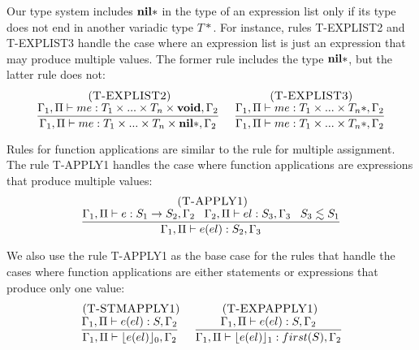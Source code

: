 Our type system includes $\mathbf{nil}{*}$ in the type of an expression list only
if its type does not end in another variadic type $T{*}$.
For instance, rules \textsc{T-EXPLIST2} and \textsc{T-EXPLIST3} handle
the case where an expression list is just an expression that may produce
multiple values.
The former rule includes the type $\mathbf{nil}{*}$, but the latter rule does not:
\[
\begin{array}{c}
\begin{array}{c}
\; (\textsc{T-EXPLIST2})\\
\dfrac{\Gamma_{1}, \Pi \vdash me:T_{1} \times ... \times T_{n} \times \mathbf{void}, \Gamma_{2}}
      {\Gamma_{1}, \Pi \vdash me:T_{1} \times ... \times T_{n} \times \mathbf{nil}{*}, \Gamma_{2}}
\end{array}
\;
\begin{array}{c}
\; (\textsc{T-EXPLIST3})\\
\dfrac{\Gamma_{1}, \Pi \vdash me:T_{1} \times ... \times T_{n}{*}, \Gamma_{2}}
      {\Gamma_{1}, \Pi \vdash me:T_{1} \times ... \times T_{n}{*}, \Gamma_{2}}
\end{array}
\end{array}
\]

Rules for function applications are similar to the rule for multiple assignment.
The rule \textsc{T-APPLY1} handles the case where function applications
are expressions that produce multiple values:
\[
\begin{array}{c}
\; (\textsc{T-APPLY1})\\
\dfrac{\Gamma_{1}, \Pi \vdash e:S_{1} \rightarrow S_{2}, \Gamma_{2} \;\;\;
       \Gamma_{2}, \Pi \vdash el:S_{3}, \Gamma_{3} \;\;\;
       S_{3} \lesssim S_{1}}
      {\Gamma_{1}, \Pi \vdash e(el):S_{2}, \Gamma_{3}}
\end{array}
\]

We also use the rule \textsc{T-APPLY1} as the base case for the rules
that handle the cases where function applications are either statements
or expressions that produce only one value:
\[
\begin{array}{c}
\begin{array}{c}
\; (\textsc{T-STMAPPLY1})\\
\dfrac{\Gamma_{1}, \Pi \vdash e(el):S, \Gamma_{2}}
      {\Gamma_{1}, \Pi \vdash \lfloor e(el) \rfloor_{0},\Gamma_{2}}
\end{array}
\;
\begin{array}{c}
\; (\textsc{T-EXPAPPLY1})\\
\dfrac{\Gamma_{1}, \Pi \vdash e(el):S, \Gamma_{2}}
      {\Gamma_{1}, \Pi \vdash \lfloor e(el) \rfloor_{1}:first(S), \Gamma_{2}}
\end{array}
\end{array}
\]

